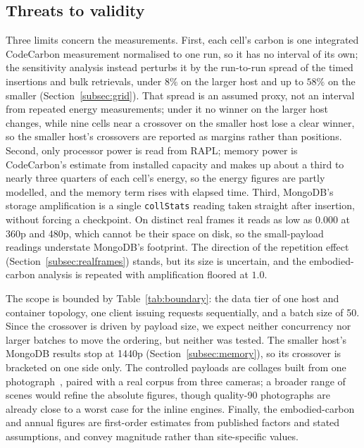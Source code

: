 \documentclass[pdflatex,sn-basic]{sn-jnl}%
\begin{document}
\subsection{Threats to validity}\label{subsec:threats}
{\color{markup}Three limits concern the measurements.} {\color{markup}First, each cell's carbon is one integrated CodeCarbon measurement normalised to one run, so it has no interval of its own; the sensitivity analysis instead perturbs it by the run-to-run spread of the timed insertions and bulk retrievals, under $8\%$ on the larger host and up to $58\%$ on the smaller (Section~\ref{subsec:grid}).} {\color{markup}That spread is an assumed proxy, not an interval from repeated energy measurements; under it no winner on the larger host changes, while nine cells near a crossover on the smaller host lose a clear winner, so the smaller host's crossovers are reported as margins rather than positions.} {\color{markup}Second, only processor power is read from RAPL; memory power is CodeCarbon's estimate from installed capacity and makes up about a third to nearly three quarters of each cell's energy, so the energy figures are partly modelled, and the memory term rises with elapsed time.} {\color{markup}Third, MongoDB's storage amplification is a single \texttt{collStats} reading taken straight after insertion, without forcing a checkpoint.} {\color{markup}On distinct real frames it reads as low as $0.000$ at 360p and 480p, which cannot be their space on disk, so the small-payload readings understate MongoDB's footprint.} {\color{markup}The direction of the repetition effect (Section~\ref{subsec:realframes}) stands, but its size is uncertain, and the embodied-carbon analysis is repeated with amplification floored at $1.0$.}

{\color{markup}The scope is bounded by Table~\ref{tab:boundary}: the data tier of one host and container topology, one client issuing requests sequentially, and a batch size of 50.} {\color{markup}Since the crossover is driven by payload size, we expect neither concurrency nor larger batches to move the ordering, but neither was tested.} {\color{markup}The smaller host's MongoDB results stop at 1440p (Section~\ref{subsec:memory}), so its crossover is bracketed on one side only.} {\color{markup}The controlled payloads are collages built from one photograph~\citep{pexels_durdle_door}, paired with a real corpus from three cameras; a broader range of scenes would refine the absolute figures, though quality-90 photographs are already close to a worst case for the inline engines.} {\color{markup}Finally, the embodied-carbon and annual figures are first-order estimates from published factors and stated assumptions, and convey magnitude rather than site-specific values.}
\end{document}
